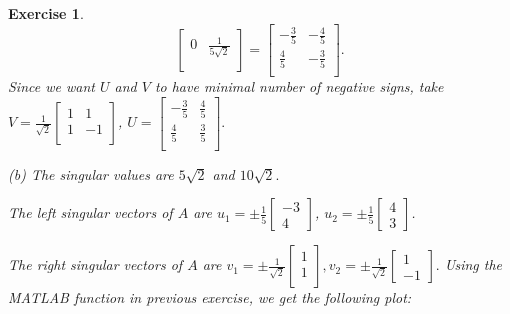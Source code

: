 \documentclass[paper=a4, fontsize=11pt]{scrartcl} %
\numberwithin{equation}{section} %
\numberwithin{figure}{section} %
\numberwithin{table}{section} %
\newtheorem{exercise}{Exercise}
\numberwithin{exercise}{section}
\begin{document}
\begin{exercise}
$$\begin{bmatrix}
0 &  \frac{1}{5\sqrt{2}} \\
\end{bmatrix}=\begin{bmatrix}
-\frac{3}{5}  & -\frac{4}{5} \\
\frac{4}{5}  & -\frac{3}{5} \\
\end{bmatrix}.$$
Since we want $U$ and $V$ to have minimal number of negative signs,
take $V=\frac{1}{\sqrt{2}}\begin{bmatrix}
1 & 1 \\
1 & -1\\
\end{bmatrix}$, $U=\begin{bmatrix}
-\frac{3}{5}  & \frac{4}{5} \\
\frac{4}{5}  & \frac{3}{5} \\
\end{bmatrix}.$

(b) The singular values are $5\sqrt{2}$ and $10\sqrt{2}.$

The left singular vectors of $A$ are $u_1=\pm\frac{1}{5}\begin{bmatrix}
-3 \\ 4
\end{bmatrix}$, $u_2=\pm\frac{1}{5}\begin{bmatrix}
4 \\ 3
\end{bmatrix}$.

The right singular  vectors of $A$ are $v_1=\pm\frac{1}{\sqrt{2}} \begin{bmatrix}
1 \\ 1\\
\end{bmatrix}, v_2=\pm\frac{1}{\sqrt{2}}\begin{bmatrix}
1 \\ -1
\end{bmatrix}.$ Using the MATLAB function in previous exercise, we get the following plot:


\end{exercise}
\end{document}
